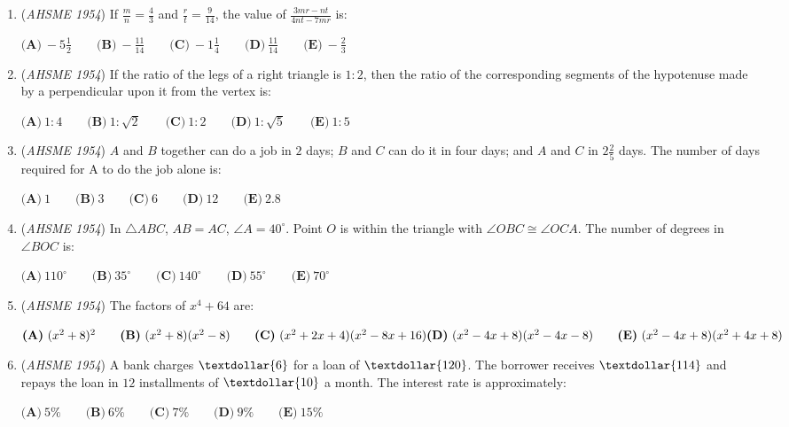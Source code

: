 \begin{enumerate}
	\item (\textit{AHSME 1954}) If $\frac{m}{n}=\frac{4}{3}$ and $\frac{r}{t}=\frac{9}{14}$, the value of $\frac{3mr-nt}{4nt-7mr}$ is: 


 $\textbf{(A)}\ -5\frac{1}{2}\qquad\textbf{(B)}\ -\frac{11}{14}\qquad\textbf{(C)}\ -1\frac{1}{4}\qquad\textbf{(D)}\ \frac{11}{14}\qquad\textbf{(E)}\ -\frac{2}{3}$


	\item (\textit{AHSME 1954}) If the ratio of the legs of a right triangle is $1: 2$, then the ratio of the corresponding segments of 
the hypotenuse made by a perpendicular upon it from the vertex is: 


 $\textbf{(A)}\ 1: 4\qquad\textbf{(B)}\ 1:\sqrt{2}\qquad\textbf{(C)}\ 1: 2\qquad\textbf{(D)}\ 1:\sqrt{5}\qquad\textbf{(E)}\ 1: 5$


	\item (\textit{AHSME 1954}) $A$ and $B$ together can do a job in $2$ days; $B$ and $C$ can do it in four days; and $A$ and $C$ in $2\frac{2}{5}$ days. 
The number of days required for A to do the job alone is: 


 $\textbf{(A)}\ 1 \qquad \textbf{(B)}\ 3 \qquad \textbf{(C)}\ 6 \qquad \textbf{(D)}\ 12 \qquad \textbf{(E)}\ 2.8$


	\item (\textit{AHSME 1954}) In $\triangle ABC$, $AB=AC$, $\angle A=40^\circ$. Point $O$ is within the triangle with $\angle OBC \cong \angle OCA$. 
The number of degrees in $\angle BOC$ is: 


 $\textbf{(A)}\ 110^{\circ} \qquad \textbf{(B)}\ 35^{\circ} \qquad \textbf{(C)}\ 140^{\circ} \qquad \textbf{(D)}\ 55^{\circ} \qquad \textbf{(E)}\ 70^{\circ}$


	\item (\textit{AHSME 1954}) The factors of $x^4+64$ are: 


 $\textbf{(A)}\ (x^2+8)^2\qquad\textbf{(B)}\ (x^2+8)(x^2-8)\qquad\textbf{(C)}\ (x^2+2x+4)(x^2-8x+16)\\ \textbf{(D)}\ (x^2-4x+8)(x^2-4x-8)\qquad\textbf{(E)}\ (x^2-4x+8)(x^2+4x+8)$


	\item (\textit{AHSME 1954}) A bank charges $\textdollar{6}$ for a loan of $\textdollar{120}$. The borrower receives $\textdollar{114}$ and 
repays the loan in $12$ installments of $\textdollar{10}$ a month. The interest rate is approximately: 


 $\textbf{(A)}\ 5 \% \qquad \textbf{(B)}\ 6 \% \qquad \textbf{(C)}\ 7 \% \qquad \textbf{(D)}\ 9\% \qquad \textbf{(E)}\ 15 \%$



\end{enumerate}
